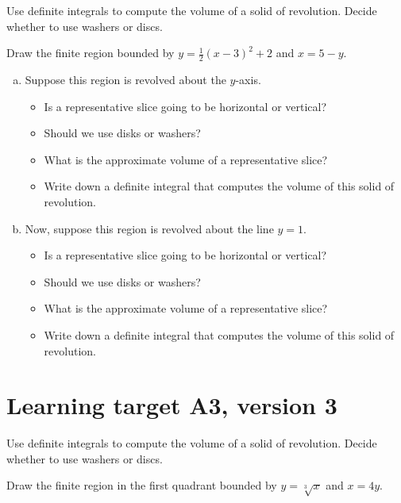 Use definite integrals to compute the volume of a solid of revolution. Decide whether to use washers or discs.

\hrulefill

Draw the finite region bounded by $y = \frac{1}{2}(x-3)^2+2$ and $x = 5 - y$.

\begin{enumerate}[(a), leftmargin=20pt]
	\item Suppose this region is revolved about the $y$-axis.
	\begin{itemize}
		\item Is a representative slice going to be horizontal or vertical?
		\item Should we use disks or washers?
		\item What is the approximate volume of a representative slice?
		\item Write down a definite integral that computes the volume of this solid of revolution.
	\end{itemize}

	\vfill

	\item Now, suppose this region is revolved about the line $y=1$.
	\begin{itemize}
		\item Is a representative slice going to be horizontal or vertical?
		\item Should we use disks or washers?
		\item What is the approximate volume of a representative slice?
		\item Write down a definite integral that computes the volume of this solid of revolution.
	\end{itemize}

	\vfill
\end{enumerate}

\pagebreak
\section{Learning target A3, version 3}

Use definite integrals to compute the volume of a solid of revolution. Decide whether to use washers or discs.

\hrulefill

Draw the finite region in the first quadrant bounded by $y = \sqrt[3]{x}$ and $x = 4y$.

